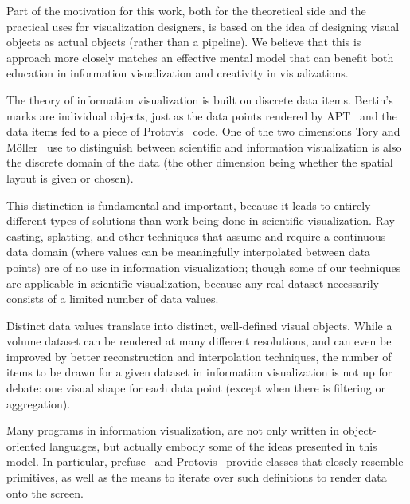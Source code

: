 \label{cognitiveMotivation}

Part of the motivation for this work, both for the theoretical side and the practical uses for visualization designers, is based on the idea of designing visual objects as actual objects (rather than a pipeline).
We believe that this is approach more closely matches an effective mental model that can benefit both education in information visualization and creativity in visualizations.

\label{infoVisModel}

The theory of information visualization is built on discrete data items.
Bertin's marks are individual objects, just as the data points rendered by APT~\cite{Mackinlay1986} and the data items fed to a piece of Protovis~\cite{bostock2009Protovis} code.
One of the two dimensions Tory and M\"oller~\cite{tory2004rethinking} use to distinguish between scientific and information visualization is also the discrete domain of the data (the other dimension being whether the spatial layout is given or chosen).

This distinction is fundamental and important, because it leads to entirely different types of solutions than work being done in scientific visualization.
Ray casting, splatting, and other techniques that assume and require a continuous data domain (where values can be meaningfully interpolated between data points) are of no use in information visualization; though some of our techniques are applicable in scientific visualization, because any real dataset necessarily consists of a limited number of data values.

Distinct data values translate into distinct, well-defined visual objects.
While a volume dataset can be rendered at many different resolutions, and can even be improved by better reconstruction and interpolation techniques, the number of items to be drawn for a given dataset in information visualization is not up for debate: one visual shape for each data point (except when there is filtering or aggregation).

Many programs in information visualization, are not only written in object-oriented languages, but actually embody some of the ideas presented in this model.
In particular, prefuse~\cite{heer2005prefuse} and Protovis~\cite{bostock2009Protovis} provide classes that closely resemble primitives, as well as the means to iterate over such definitions to render data onto the screen.

